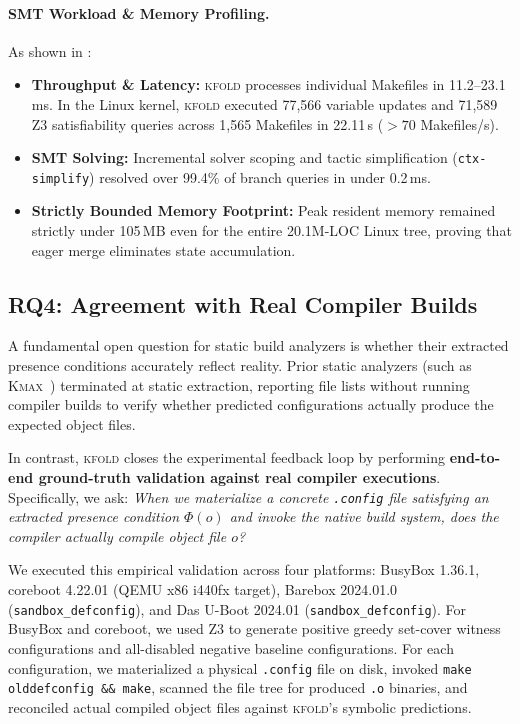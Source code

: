 \documentclass[acmsmall,screen,review]{acmart}
\newcommand{\tool}{\textsc{kfold}\xspace}
\begin{document}
\paragraph{SMT Workload \& Memory Profiling.}
As shown in :
\begin{itemize}
\item \textbf{Throughput \& Latency:} \tool processes individual Makefiles in 11.2--23.1\,ms. In the Linux kernel, \tool executed 77,566 variable updates and 71,589 Z3 satisfiability queries across 1,565 Makefiles in 22.11\,s ($>70$ Makefiles/s).
\item \textbf{SMT Solving:} Incremental solver scoping and tactic simplification (\texttt{ctx-simplify}) resolved over 99.4\% of branch queries in under 0.2\,ms.
\item \textbf{Strictly Bounded Memory Footprint:} Peak resident memory remained strictly under 105\,MB even for the entire 20.1M-LOC Linux tree, proving that eager merge eliminates state accumulation.
\end{itemize}

\subsection{RQ4: Agreement with Real Compiler Builds}
\label{sec:eval:rq4}

A fundamental open question for static build analyzers is whether their extracted presence conditions accurately reflect reality. Prior static analyzers (such as \textsc{Kmax}~\cite{kmax}) terminated at static extraction, reporting file lists without running compiler builds to verify whether predicted configurations actually produce the expected object files. 

In contrast, \tool closes the experimental feedback loop by performing \textbf{end-to-end ground-truth validation against real compiler executions}. Specifically, we ask: \emph{When we materialize a concrete \texttt{.config} file satisfying an extracted presence condition $\Phi(o)$ and invoke the native build system, does the compiler actually compile object file $o$?}

We executed this empirical validation across four platforms: BusyBox 1.36.1, coreboot 4.22.01 (QEMU x86 i440fx target), Barebox 2024.01.0 (\texttt{sandbox\_defconfig}), and Das U-Boot 2024.01 (\texttt{sandbox\_defconfig}). For BusyBox and coreboot, we used Z3 to generate positive greedy set-cover witness configurations and all-disabled negative baseline configurations. For each configuration, we materialized a physical \texttt{.config} file on disk, invoked \texttt{make olddefconfig \&\& make}, scanned the file tree for produced \texttt{.o} binaries, and reconciled actual compiled object files against \tool's symbolic predictions.
\end{document}
